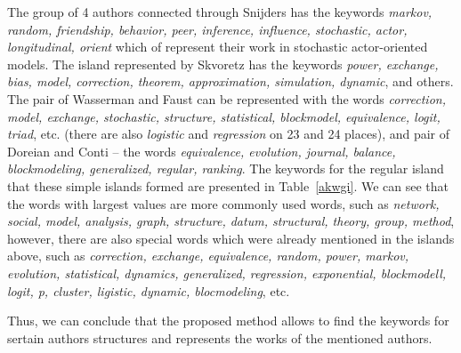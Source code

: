 \documentclass[11pt]{article} %
\begin{document}
The group of 4 authors connected through Snijders has the keywords \textit{markov, random, friendship, behavior, peer, inference, influence, stochastic, actor, longitudinal, orient} which of represent their work in stochastic actor-oriented models. The island represented by Skvoretz has the keywords \textit{power, exchange, bias, model, correction, theorem, approximation, simulation, dynamic}, and others. The pair of Wasserman and Faust can be represented with the words \textit{correction, model, exchange, stochastic, structure, statistical, blockmodel, equivalence, logit, triad}, etc. (there are also \textit{logistic} and \textit{regression} on 23 and 24 places), and pair of Doreian and Conti -- the words \textit{equivalence, evolution, journal, balance, blockmodeling, generalized, regular, ranking}. The keywords for the regular island that these simple islands formed are presented in  Table~\ref{akwgi}. We can see that the words with largest values are more commonly used words, such as \textit{network, social, model, analysis, graph, structure, datum, structural, theory, group, method}, however, there are also special words which were already mentioned in the islands above, such as \textit{correction, exchange, equivalence, random, power, markov, evolution,  statistical, dynamics, generalized, regression, exponential, blockmodell, logit, p, cluster, ligistic, dynamic, blocmodeling}, etc.\medskip

Thus, we can conclude that the proposed method allows to find the keywords for sertain authors structures and represents the works of the mentioned authors. \medskip
\end{document}
